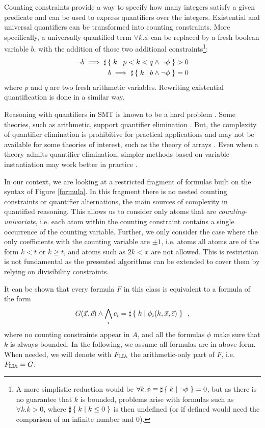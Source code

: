 Counting constraints provide a way to specify how many integers
satisfy a given predicate and can be used to
express quantifiers over the integers. Existential and universal quantifiers can
be transformed into counting constraints. More specifically, a universally
quantified term $\forall k . \phi$ can be replaced by a fresh boolean variable
$b$, with the addition of those two additional constraints\footnote{A more simplistic reduction would be
  $\forall k . \phi \equiv \sharp\left\lbrace\;k\;|\;\lnot \phi\;\right\rbrace = 0$, but as there is no guarantee
  that $k$ is bounded, problems arise with formulas such as $\forall k . k > 0$,
  where $\sharp\left\lbrace\;k\;|\;k\leq 0\;\right\rbrace$ is then undefined (or if defined would need the
  comparison of an infinite number and $0$).}:
\begin{align*}
  \lnot b \implies \sharp\left\lbrace\;k\;|\;p < k < q \land \lnot \phi\;\right\rbrace > 0 \\
  b \implies \sharp\left\lbrace\;k\;|\;b \land \lnot \phi\;\right\rbrace = 0
\end{align*}
 where $p$ and $q$ are two fresh arithmetic variables. Rewriting existential
 quantification is done in a similar way.

Reasoning with quantifiers in SMT is known to be a hard problem
\cite{ge2010solving,weispfenning1988complexity}. Some theories, such
as arithmetic, support quantifier elimination \cite{cooper}. But, the
complexity of quantifier elimination is prohibitive for practical
applications and may not be available for some theories of interest,
such as the theory of arrays \cite{bradley2006s}. Even when a theory
admits quantifier elimination,  simpler methods based on variable
instantiation may work better in practice \cite{dutertre2015solving}.

In our context, we are looking at a restricted fragment of formulas
built on the syntax of Figure \ref{formula}. In this fragment there is
no nested counting constraints or quantifier alternations, the main
sources of complexity in quantified reasoning. This allows us to
consider only atoms that are \emph{counting-univariate}, i.e. each
atom within the counting constraint contains a single occurrence of
the counting variable. Further, we only consider the case where the
only coefficients with the counting variable are $\pm 1$, i.e. atoms
all atoms are of the form $k < t$ or $k \geq t$, and atoms such as $2k <
x$ are not allowed. This is restriction is not fundamental as the
presented algorithms can be extended to cover them by relying on
divisibility constraints.

It can be shown that every formula $F$ in this class is equivalent to a
formula of the form
\begin{equation}
\label{maingoal}
G(\vec{x}, \vec{c}) \land \bigwedge_i c_i = \sharp\left\lbrace\;k\;|\;\phi_i(k, \vec{x}, \vec{c})\;\right\rbrace\enspace,
\end{equation}
where no counting constraints appear in $A$, and all the formulas $\phi$
make sure that $k$ is always bounded. In the following, we assume all
formulas are in above form. When needed, we will denote with $F_{\mathbb{LIA}}$
the arithmetic-only part of $F$, i.e. $F_{\mathbb{LIA}} = G$.

